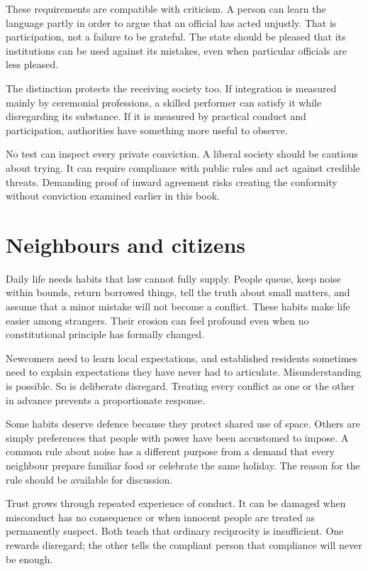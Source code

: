 \documentclass[12pt,a4paper]{book}
\begin{document}
These requirements are compatible with criticism. A person can learn the language partly in order to argue that an official has acted unjustly. That is participation, not a failure to be grateful. The state should be pleased that its institutions can be used against its mistakes, even when particular officials are less pleased.

The distinction protects the receiving society too. If integration is measured mainly by ceremonial professions, a skilled performer can satisfy it while disregarding its substance. If it is measured by practical conduct and participation, authorities have something more useful to observe.

No test can inspect every private conviction. A liberal society should be cautious about trying. It can require compliance with public rules and act against credible threats. Demanding proof of inward agreement risks creating the conformity without conviction examined earlier in this book.

\section*{Neighbours and citizens}

Daily life needs habits that law cannot fully supply. People queue, keep noise within bounds, return borrowed things, tell the truth about small matters, and assume that a minor mistake will not become a conflict. These habits make life easier among strangers. Their erosion can feel profound even when no constitutional principle has formally changed.

Newcomers need to learn local expectations, and established residents sometimes need to explain expectations they have never had to articulate. Misunderstanding is possible. So is deliberate disregard. Treating every conflict as one or the other in advance prevents a proportionate response.

Some habits deserve defence because they protect shared use of space. Others are simply preferences that people with power have been accustomed to impose. A common rule about noise has a different purpose from a demand that every neighbour prepare familiar food or celebrate the same holiday. The reason for the rule should be available for discussion.

Trust grows through repeated experience of conduct. It can be damaged when misconduct has no consequence or when innocent people are treated as permanently suspect. Both teach that ordinary reciprocity is insufficient. One rewards disregard; the other tells the compliant person that compliance will never be enough.
\end{document}
